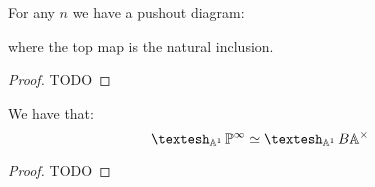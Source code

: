 \begin{lemma}
For any $n$ we have a pushout diagram:
 \begin{center}
  \end{center}
  where the top map is the natural inclusion.
\end{lemma}

\begin{proof}
TODO
\end{proof}

\begin{proposition}
We have that:
\[\shape_{\A^1} \bP^\infty \simeq \shape_{\A^1} B\A^\times\]
\end{proposition}

\begin{proof}
TODO
\end{proof}